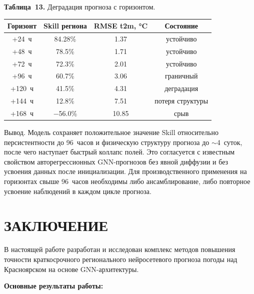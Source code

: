 \documentclass[14pt,a4paper]{extarticle}
\newcounter{none}
\numberwithin{table}{section}
\numberwithin{figure}{section}
\numberwithin{equation}{section}
\begin{document}
\textbf{Таблица~13.} Деградация прогноза с горизонтом.

{\def\LTcaptype{none}
\begin{longtable}[]{@{}cccc@{}}
\toprule\noalign{}
Горизонт & Skill региона & RMSE t2m, °C & Состояние \\
\midrule\noalign{}
\endhead
\bottomrule\noalign{}
\endlastfoot
+24~ч  & 84.28\% & 1.37 & устойчиво \\
+48~ч  & 78.5\%  & 1.71 & устойчиво \\
+72~ч  & 72.3\%  & 2.01 & устойчиво \\
+96~ч  & 60.7\%  & 3.06 & граничный \\
+120~ч & 41.5\%  & 4.31 & деградация \\
+144~ч & 12.8\%  & 7.51 & потеря структуры \\
+168~ч & −56.0\% & 10.85 & срыв \\
\end{longtable}
}

Вывод. Модель сохраняет положительное значение Skill относительно
персистентности до 96~часов и физическую структуру прогноза до
\(\sim\)4~суток, после чего наступает
быстрый коллапс полей. Это согласуется с известным свойством
авторегрессионных GNN-прогнозов без явной диффузии и без усвоения данных
после инициализации. Для производственного применения на горизонтах
свыше 96~часов необходимы либо ансамблирование, либо повторное усвоение
наблюдений в каждом цикле прогноза.


\newpage

\section{ЗАКЛЮЧЕНИЕ}\label{ux437ux430ux43aux43bux44eux447ux435ux43dux438ux435}

В настоящей работе разработан и исследован комплекс методов повышения
точности краткосрочного регионального нейросетевого прогноза погоды над
Красноярском на основе GNN-архитектуры.

\textbf{Основные результаты работы:}
\end{document}
